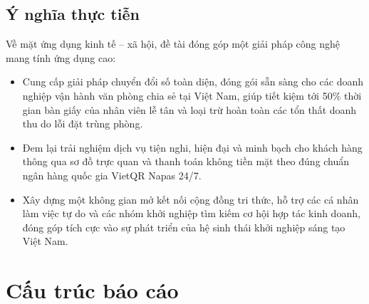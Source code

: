 \subsection{Ý nghĩa thực tiễn}
Về mặt ứng dụng kinh tế -- xã hội, đề tài đóng góp một giải pháp công nghệ mang tính ứng dụng cao:
\begin{itemize}
    \item Cung cấp giải pháp chuyển đổi số toàn diện, đóng gói sẵn sàng cho các doanh nghiệp vận hành văn phòng chia sẻ tại Việt Nam, giúp tiết kiệm tới 50\% thời gian bàn giấy của nhân viên lễ tân và loại trừ hoàn toàn các tổn thất doanh thu do lỗi đặt trùng phòng.
    \item Đem lại trải nghiệm dịch vụ tiện nghi, hiện đại và minh bạch cho khách hàng thông qua sơ đồ trực quan và thanh toán không tiền mặt theo đúng chuẩn ngân hàng quốc gia VietQR Napas 24/7.
    \item Xây dựng một không gian mở kết nối cộng đồng tri thức, hỗ trợ các cá nhân làm việc tự do và các nhóm khởi nghiệp tìm kiếm cơ hội hợp tác kinh doanh, đóng góp tích cực vào sự phát triển của hệ sinh thái khởi nghiệp sáng tạo Việt Nam.
\end{itemize}

\section{Cấu trúc báo cáo}
\label{sec:cautruc}

